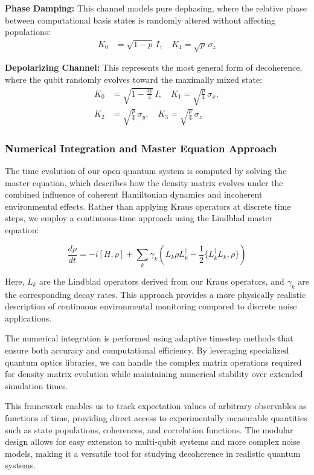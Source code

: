 \documentclass[%
 reprint,
 amsmath,amssymb,
 aps,
]{revtex4-2}
\begin{document}
\textbf{Phase Damping:} This channel models pure dephasing, where the relative phase between computational basis states is randomly altered without affecting populations:
\begin{align}
K_0 &= \sqrt{1-p}\,I, \quad K_1 = \sqrt{p}\,\sigma_z
\end{align}

\textbf{Depolarizing Channel:} This represents the most general form of decoherence, where the qubit randomly evolves toward the maximally mixed state:
\begin{align}
K_0 &= \sqrt{1-\frac{3p}{4}}\,I, \quad K_1 = \sqrt{\frac{p}{4}}\,\sigma_x, \\
K_2 &= \sqrt{\frac{p}{4}}\,\sigma_y, \quad K_3 = \sqrt{\frac{p}{4}}\,\sigma_z
\end{align}

\subsubsection{Numerical Integration and Master Equation Approach}

The time evolution of our open quantum system is computed by solving the master equation, which describes how the density matrix evolves under the combined influence of coherent Hamiltonian dynamics and incoherent environmental effects. Rather than applying Kraus operators at discrete time steps, we employ a continuous-time approach using the Lindblad master equation:

\begin{equation}
\frac{d\rho}{dt} = -i[H, \rho] + \sum_k \gamma_k \left( L_k \rho L_k^\dagger - \frac{1}{2}\{L_k^\dagger L_k, \rho\} \right)
\end{equation}

Here, $L_k$ are the Lindblad operators derived from our Kraus operators, and $\gamma_k$ are the corresponding decay rates. This approach provides a more physically realistic description of continuous environmental monitoring compared to discrete noise applications.

The numerical integration is performed using adaptive timestep methods that ensure both accuracy and computational efficiency. By leveraging specialized quantum optics libraries, we can handle the complex matrix operations required for density matrix evolution while maintaining numerical stability over extended simulation times.

This framework enables us to track expectation values of arbitrary observables as functions of time, providing direct access to experimentally measurable quantities such as state populations, coherences, and correlation functions. The modular design allows for easy extension to multi-qubit systems and more complex noise models, making it a versatile tool for studying decoherence in realistic quantum systems.
\end{document}
